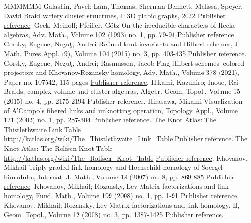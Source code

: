 \documentclass[11pt]{article}
\theoremstyle{definition}
\numberwithin{equation}{section}
\begin{document}
\begin{thebibliography}{MMMMMM}
 Galashin, Pavel; Lam, Thomas; Sherman-Bennett, Melissa; Speyer, David Braid variety cluster structures, I: 3D plabic graphs, 2022 \href{https://alco.centre-mersenne.org/articles/10.5802/alco.345/#GLSBS1}{Publisher reference}.
 Geck, Meinolf; Pfeiffer, Götz On the irreducible characters of Hecke algebras, Adv. Math., Volume 102 (1993) no. 1, pp. 79-94 \href{https://alco.centre-mersenne.org/articles/10.5802/alco.345/#GePf}{Publisher reference}.
 Gorsky, Eugene; Neguţ, Andrei Refined knot invariants and Hilbert schemes, J. Math. Pures Appl. (9), Volume 104 (2015) no. 3, pp. 403-435 \href{https://alco.centre-mersenne.org/articles/10.5802/alco.345/#GN}{Publisher reference}.
 Gorsky, Eugene; Neguţ, Andrei; Rasmussen, Jacob Flag Hilbert schemes, colored projectors and Khovanov-Rozansky homology, Adv. Math., Volume 378 (2021), Paper no. 107542, 115 pages \href{https://alco.centre-mersenne.org/articles/10.5802/alco.345/#GNR}{Publisher reference}.
 Hikami, Kazuhiro; Inoue, Rei Braids, complex volume and cluster algebras, Algebr. Geom. Topol., Volume 15 (2015) no. 4, pp. 2175-2194 \href{https://alco.centre-mersenne.org/articles/10.5802/alco.345/#HiIn}{Publisher reference}.
 Hirasawa, Mikami Visualization of A’Campo’s fibered links and unknotting operation, Topology Appl., Volume 121 (2002) no. 1, pp. 287-304 \href{https://alco.centre-mersenne.org/articles/10.5802/alco.345/#Hirasawa}{Publisher reference}.
 The Knot Atlas: The Thistlethwaite Link Table \url{http://katlas.org/wiki/The_Thistlethwaite_Link_Table} \href{https://alco.centre-mersenne.org/articles/10.5802/alco.345/#KAT}{Publisher reference}.
 The Knot Atlas: The Rolfsen Knot Table \url{http://katlas.org/wiki/The_Rolfsen_Knot_Table} \href{https://alco.centre-mersenne.org/articles/10.5802/alco.345/#KAT_knot}{Publisher reference}.
 Khovanov, Mikhail Triply-graded link homology and Hochschild homology of Soergel bimodules, Internat. J. Math., Volume 18 (2007) no. 8, pp. 869-885 \href{https://alco.centre-mersenne.org/articles/10.5802/alco.345/#KhoSoe}{Publisher reference}.
 Khovanov, Mikhail; Rozansky, Lev Matrix factorizations and link homology, Fund. Math., Volume 199 (2008) no. 1, pp. 1-91 \href{https://alco.centre-mersenne.org/articles/10.5802/alco.345/#KR1}{Publisher reference}.
 Khovanov, Mikhail; Rozansky, Lev Matrix factorizations and link homology. II, Geom. Topol., Volume 12 (2008) no. 3, pp. 1387-1425 \href{https://alco.centre-mersenne.org/articles/10.5802/alco.345/#KR2}{Publisher reference}.

\end{thebibliography}
\end{document}
